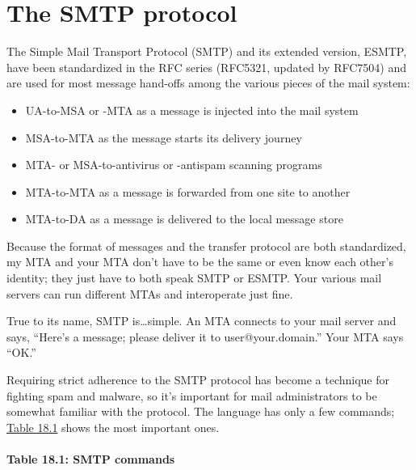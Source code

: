 \section{The SMTP protocol}

The
\protect\hypertarget{part0026_split_009.htmlux5cux23_idIndexMarker2429}{}{}Simple
Mail Transport Protocol (SMTP) and its extended version,
\protect\hypertarget{part0026_split_009.htmlux5cux23_idIndexMarker2430}{}{}ESMTP,
have been standardized in the RFC series (RFC5321, updated by RFC7504)
and are used for most message hand-offs among the various pieces of the
mail system:

\begin{itemize}
\item
  UA-to-MSA or -MTA as a message is injected into the mail system
\item
  MSA-to-MTA as the message starts its delivery journey
\item
  MTA- or MSA-to-antivirus or -antispam scanning programs
\item
  MTA-to-MTA as a message is forwarded from one site to another
\item
  MTA-to-DA as a message is delivered to the local message store
\end{itemize}

Because the format of messages and the transfer protocol are both
standardized, my MTA and your MTA don't have to be the same or even know
each other's identity; they just have to both speak SMTP or ESMTP. Your
various mail servers can run different MTAs and interoperate just fine.

True to its name, SMTP is\ldots simple. An MTA connects to your mail
server and says, ``Here's a message; please deliver it to
user@your.domain.'' Your MTA says ``OK.''

Requiring strict adherence to the SMTP protocol has become a technique
for fighting spam and malware, so it's important for mail administrators
to be somewhat familiar with the protocol. The language has only a few
commands;
\protect\hyperlink{part0026_split_009.htmlux5cux23_idTextAnchor1012}{Table
18.1} shows the most important ones.

\paragraph[{Table 18.1: }SMTP commands]{\texorpdfstring{{Table 18.1:
}\protect\hypertarget{part0026_split_009.htmlux5cux23_idIndexMarker2431}{}{}\protect\hypertarget{part0026_split_009.htmlux5cux23_idTextAnchor1012}{}{}\protect\hypertarget{part0026_split_009.htmlux5cux23_idTextAnchor1013}{}{}SMTP
commands}{Table 18.1: SMTP commands}}

